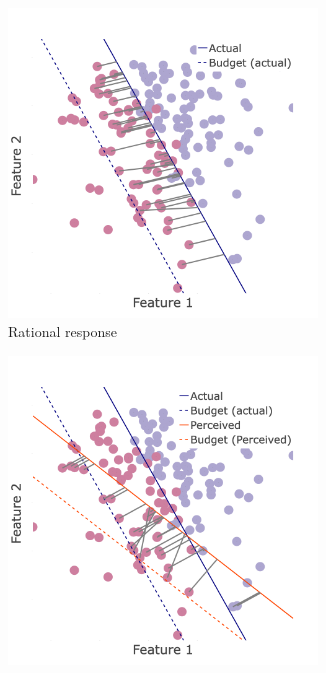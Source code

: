 \begin{figure}[ht]
    \centering
    \begin{subfigure}[t]{0.22\textwidth}
        \includegraphics[width=0.9\textwidth]{Figures/quad-NB.png}
            \caption{Rational response}
        \label{fig:NB-arrows-quad-cost}
    \end{subfigure}
    \hspace{0.01in}
    \begin{subfigure}[t]{0.22\textwidth}
        \includegraphics[width=0.9\textwidth]{Figures/quad-B.png}

\end{subfigure}
\end{figure}
